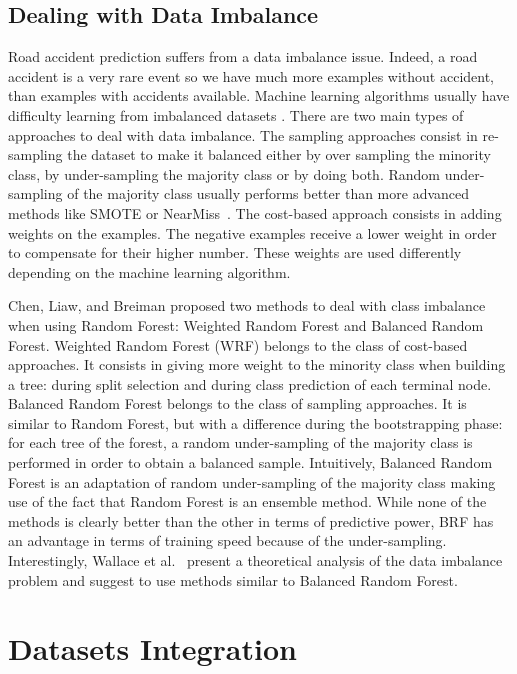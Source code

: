 \documentclass[conference]{IEEEtran}
\begin{document}
\subsection{Dealing with Data Imbalance}

Road accident prediction suffers from a data imbalance issue. Indeed, a road
accident is a very rare event so we have much more examples without accident, than examples with accidents available. Machine learning algorithms usually
have difficulty learning from imbalanced datasets \cite{Branco2016}.
There are two main types of approaches to deal with data imbalance. The sampling approaches consist in re-sampling the dataset to make it balanced either by over sampling the
minority class, by under-sampling the majority class or by doing both.
Random under-sampling of the majority class usually performs better than
more advanced methods like SMOTE or NearMiss~\cite{Branco2016}.
The cost-based approach consists in adding weights on the examples. The
negative examples receive a lower weight in order to compensate for their
higher number. These weights are used differently depending on the machine
learning algorithm. 

Chen, Liaw, and Breiman\cite{Chen2004} proposed two methods to deal with class imbalance
when using Random Forest: Weighted Random Forest and Balanced Random Forest.
Weighted Random Forest (WRF) belongs to the class of cost-based approaches. It consists in giving more weight to the minority class when building a tree: during split selection and during 
class prediction of each terminal node. Balanced Random Forest belongs to the class of sampling
approaches. It is similar to Random Forest, but with a
difference during the bootstrapping phase: for each tree of the forest, a random under-sampling of the
majority class is performed in order to obtain a balanced sample. Intuitively,
Balanced Random Forest is an adaptation of random under-sampling of the majority
class making use of the fact that Random Forest is an ensemble method.
While none of the methods is clearly better than the other in terms of predictive
power, BRF has an advantage in terms of training speed because of the under-sampling. Interestingly, Wallace et al.~\cite{Wallace2011} present a theoretical analysis of the data
imbalance problem and suggest to use methods similar to Balanced Random Forest.


\section{Datasets Integration}
\label{sec:datasetsintegration}
\end{document}
